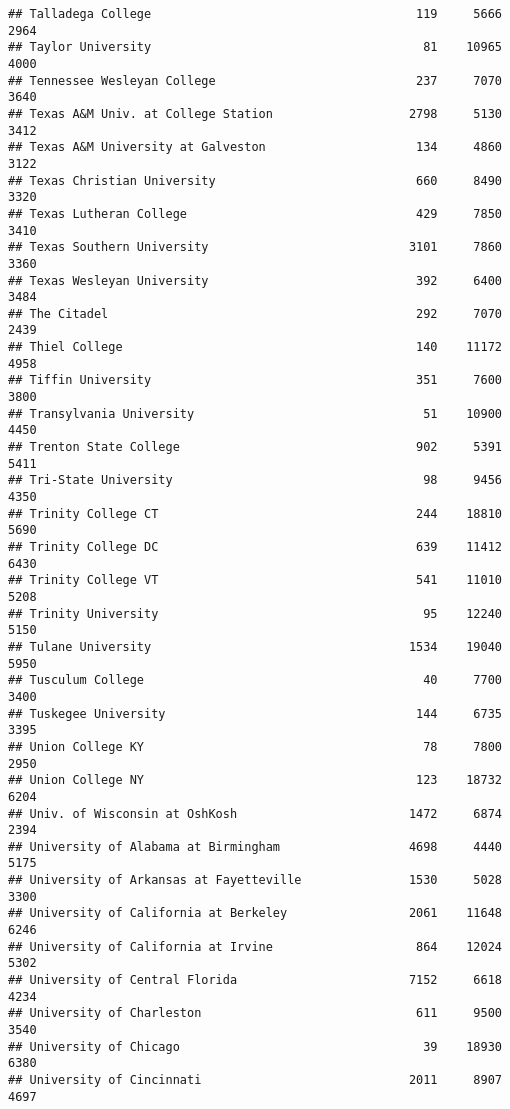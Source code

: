 \documentclass[
]{article}
\begin{document}
\begin{verbatim}
## Talladega College                                     119     5666       2964
## Taylor University                                      81    10965       4000
## Tennessee Wesleyan College                            237     7070       3640
## Texas A&M Univ. at College Station                   2798     5130       3412
## Texas A&M University at Galveston                     134     4860       3122
## Texas Christian University                            660     8490       3320
## Texas Lutheran College                                429     7850       3410
## Texas Southern University                            3101     7860       3360
## Texas Wesleyan University                             392     6400       3484
## The Citadel                                           292     7070       2439
## Thiel College                                         140    11172       4958
## Tiffin University                                     351     7600       3800
## Transylvania University                                51    10900       4450
## Trenton State College                                 902     5391       5411
## Tri-State University                                   98     9456       4350
## Trinity College CT                                    244    18810       5690
## Trinity College DC                                    639    11412       6430
## Trinity College VT                                    541    11010       5208
## Trinity University                                     95    12240       5150
## Tulane University                                    1534    19040       5950
## Tusculum College                                       40     7700       3400
## Tuskegee University                                   144     6735       3395
## Union College KY                                       78     7800       2950
## Union College NY                                      123    18732       6204
## Univ. of Wisconsin at OshKosh                        1472     6874       2394
## University of Alabama at Birmingham                  4698     4440       5175
## University of Arkansas at Fayetteville               1530     5028       3300
## University of California at Berkeley                 2061    11648       6246
## University of California at Irvine                    864    12024       5302
## University of Central Florida                        7152     6618       4234
## University of Charleston                              611     9500       3540
## University of Chicago                                  39    18930       6380
## University of Cincinnati                             2011     8907       4697

\end{verbatim}
\end{document}
